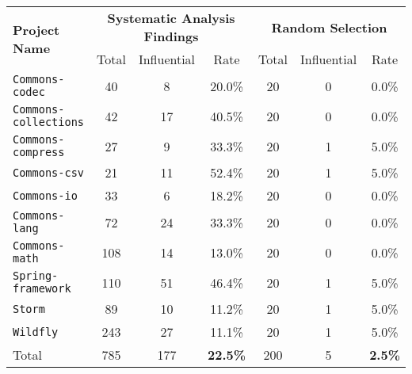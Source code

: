 \centering
\resizebox{0.8\linewidth}{!}
{
\begin{tabular}{l c c c | c c  c}
  \multirow{2}{*}{\bf Project Name} & 
  \multicolumn{3}{c|}{\bf Systematic Analysis Findings} & 
  \multicolumn{3}{c}{\bf Random Selection} \\
  & Total & Influential & Rate & Total & Influential & Rate \\

\toprule

{\tt Commons-codec} & 40 & 8 & 20.0\% & 20 & 0 & 0.0\% \\
{\tt Commons-collections} & 42 & 17 & 40.5\% & 20 & 0 & 0.0\%\\
{\tt Commons-compress} & 27 & 9 & 33.3\% & 20 & 1 & 5.0\% \\
{\tt Commons-csv} & 21 & 11 & 52.4\% & 20 & 1 & 5.0\% \\
{\tt Commons-io} & 33 & 6 & 18.2\% & 20 & 0 & 0.0\%\\
{\tt Commons-lang} & 72 & 24 & 33.3\% &20 & 0 & 0.0\%\\
{\tt Commons-math} & 108 & 14 & 13.0\% &20 &  0 & 0.0\%\\
{\tt Spring-framework} & 110 & 51 & 46.4\% &  20 & 1& 5.0\%\\
{\tt Storm} & 89 & 10 & 11.2\% & 20 & 1 & 5.0\% \\
{\tt Wildfly} & 243 & 27 & 11.1\% & 20 & 1 & 5.0\% \\
\midrule
Total & 785 & 177 & {\bf 22.5\%} & 200 & 5 & {\bf 2.5\%}\\
\bottomrule

\end{tabular}}
